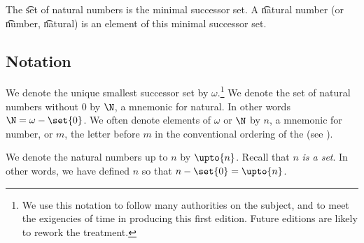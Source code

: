 The \t{set of natural numbers} is the minimal successor set.
A \t{natural number} (or \t{number}, \t{natural}) is an element of this minimal successor set.

\subsection*{Notation}


%    

We denote the unique smallest successor set by $\omega $.\footnote{We use this notation to follow many authorities on the subject, and to meet the exigencies of time in producing this first edition.
Future editions are likely to rework the treatment.}
We denote the set of natural numbers without 0 by $\N  $, a mnemonic for natural.
In other words $\N   = \omega  - \set{0}$.
We often denote elements of $\omega $ or $\N  $ by $n$, a mnemonic for number, or $m$, the letter before $m$ in the conventional ordering of the (see ).

We denote the natural numbers up to $n$ by $\upto{n}$.
Recall that $n$ \textit{is a set}.
In other words, we have defined $n$ so that $n - \set{0} = \upto{n}$.

